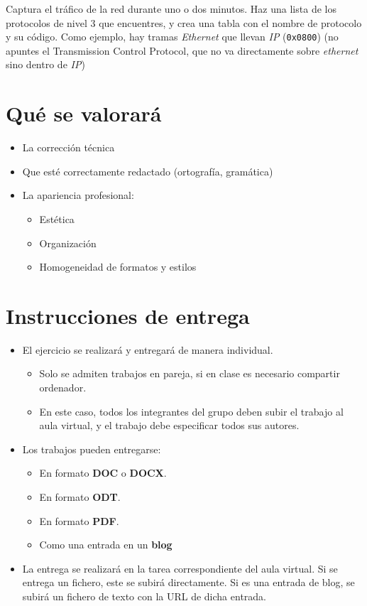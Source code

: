 \begin{homeworkProblem}
  Captura el tráfico de la red durante uno o dos minutos. Haz una lista de los protocolos de nivel 3 que encuentres, y crea una tabla con el nombre de protocolo y su código. Como ejemplo, hay tramas \textit{Ethernet} que llevan \textit{IP} (\texttt{0x0800}) (no apuntes el Transmission Control Protocol, que no va directamente sobre \textit{ethernet} sino dentro de \textit{IP})
\end{homeworkProblem}


\section{Qué se valorará}

\begin{itemize}
\item La corrección técnica 
\item Que esté correctamente redactado (ortografía, gramática)
\item La apariencia profesional:
  \begin{itemize}
  \item Estética
  \item Organización
  \item Homogeneidad de formatos y estilos
  \end{itemize}
\end{itemize}

\section{Instrucciones de entrega}
\begin{itemize}
\item El ejercicio se realizará y entregará de manera individual.
  \begin{itemize}
  \item Solo se admiten trabajos en pareja, si en clase es necesario compartir ordenador.
  \item En este caso, todos los integrantes del grupo deben subir el trabajo al aula virtual, y el trabajo debe especificar todos sus autores.
  \end{itemize}

\item Los trabajos pueden entregarse:
  \begin{itemize}
  \item En formato \textbf{DOC} o \textbf{DOCX}.
  \item En formato \textbf{ODT}.
  \item En formato \textbf{PDF}. 
  \item Como una entrada en un \textbf{blog} 

  \end{itemize}
  
\item La entrega se realizará en la tarea correspondiente del aula virtual. Si se entrega un fichero, este se subirá directamente. Si es una entrada de blog, se subirá un fichero de texto con la URL de dicha entrada.
\end{itemize}  





